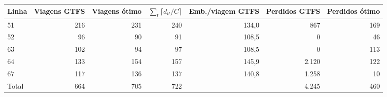 \begin{tabular}{lrrrrrr}
\toprule
Linha & Viagens GTFS & Viagens ótimo & $\sum_t\lceil d_{lt}/C\rceil$ & Emb./viagem GTFS & Perdidos GTFS & Perdidos ótimo \\
\midrule
51 & 216 & 231 & 240 & 134{,}0 & 867 & 169 \\
52 & 96 & 90 & 91 & 108{,}5 & 0 & 46 \\
63 & 102 & 94 & 97 & 108{,}5 & 0 & 113 \\
64 & 133 & 154 & 157 & 145{,}9 & 2.120 & 122 \\
67 & 117 & 136 & 137 & 140{,}8 & 1.258 & 10 \\
\midrule
Total & 664 & 705 & 722 &  & 4.245 & 460 \\
\bottomrule
\end{tabular}

